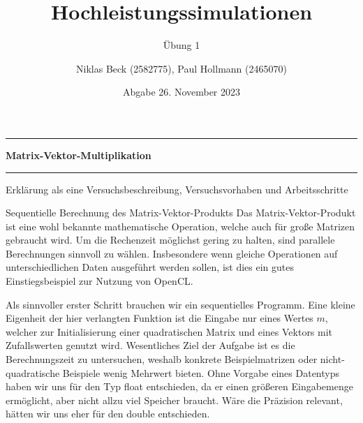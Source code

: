 \documentclass[
ngerman,
subtask=ruled %
]{tudaexercise}
\begin{document}
	
	\title[Übung Hochleistungssimulationen]{Hochleistungssimulationen}
	\subtitle{\"Ubung 1}
	\author{Niklas Beck (2582775), Paul Hollmann (2465070)}
	\date{Abgabe 26. November 2023}
	\maketitle
	
	\hrule
	{\Large \textbf{Matrix-Vektor-Multiplikation}}
	\hrule
	
	Erklärung als eine Versuchsbeschreibung, Versuchsvorhaben und Arbeitsschritte
	
	\begin{task}{Sequentielle Berechnung des Matrix-Vektor-Produkts}\label{task:1}
		Das Matrix-Vektor-Produkt ist eine wohl bekannte mathematische Operation, welche auch für große Matrizen gebraucht wird.
		Um die Rechenzeit möglichst gering zu halten, sind parallele Berechnungen sinnvoll zu wählen. Insbesondere wenn gleiche Operationen auf unterschiedlichen Daten ausgeführt werden sollen, ist dies ein gutes Einstiegsbeispiel zur Nutzung von OpenCL.
		
		Als sinnvoller erster Schritt brauchen wir ein sequentielles Programm.
		Eine kleine Eigenheit der hier verlangten Funktion ist die Eingabe nur eines Wertes $m$, welcher zur Initialisierung einer quadratischen Matrix und eines Vektors mit Zufallswerten genutzt wird. Wesentliches Ziel der Aufgabe ist es die Berechnungszeit zu untersuchen, weshalb konkrete Beispielmatrizen oder nicht-quadratische Beispiele wenig Mehrwert bieten.
		Ohne Vorgabe eines Datentyps haben wir uns für den Typ float entschieden, da er einen größeren Eingabemenge ermöglicht, aber nicht allzu viel Speicher braucht. Wäre die Präzision relevant, hätten wir uns eher für den double entschieden.
	\end{task}
	
\end{document}
